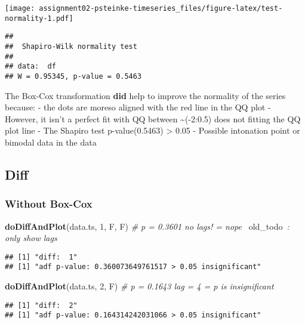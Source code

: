 \documentclass[]{article}
\newenvironment{Shaded}{\begin{snugshade}}{\end{snugshade}}
\newcommand{\AlertTok}[1]{\textcolor[rgb]{0.94,0.16,0.16}{#1}}
\newcommand{\CommentTok}[1]{\textcolor[rgb]{0.56,0.35,0.01}{\textit{#1}}}
\newcommand{\DecValTok}[1]{\textcolor[rgb]{0.00,0.00,0.81}{#1}}
\newcommand{\KeywordTok}[1]{\textcolor[rgb]{0.13,0.29,0.53}{\textbf{#1}}}
\newcommand{\NormalTok}[1]{#1}
\begin{document}
\texttt{[image: assignment02-psteinke-timeseries\_files/figure-latex/test-normality-1.pdf]}

\begin{verbatim}
## 
##  Shapiro-Wilk normality test
## 
## data:  df
## W = 0.95345, p-value = 0.5463
\end{verbatim}

The Box-Cox transformation \textbf{did} help to improve the normality of
the series because: - the dots are moreso aligned with the red line in
the QQ plot - However, it isn't a perfect fit with QQ between
\textasciitilde(-2:0.5) does not fitting the QQ plot line - The Shapiro
test p-value(0.5463) \textgreater{} 0.05 - Possible intonation point or
bimodal data in the data

\hypertarget{diff}{%
\subsection{Diff}\label{diff}}

\hypertarget{without-box-cox}{%
\subsubsection{Without Box-Cox}\label{without-box-cox}}

\begin{Shaded}
\begin{Highlighting}[]
\KeywordTok{doDiffAndPlot}\NormalTok{(data.ts, }\DecValTok{1}\NormalTok{, F, F) }\CommentTok{# p = 0.3601 no lags! = nope }\AlertTok{~old_todo~}\CommentTok{: only show lags}
\end{Highlighting}
\end{Shaded}

\begin{verbatim}
## [1] "diff:  1"
## [1] "adf p-value: 0.360073649761517 > 0.05 insignificant"
\end{verbatim}

\begin{Shaded}
\begin{Highlighting}[]
\KeywordTok{doDiffAndPlot}\NormalTok{(data.ts, }\DecValTok{2}\NormalTok{, F) }\CommentTok{# p = 0.1643 lag = 4 = p is insignificant}
\end{Highlighting}
\end{Shaded}

\begin{verbatim}
## [1] "diff:  2"
## [1] "adf p-value: 0.164314242031066 > 0.05 insignificant"
\end{verbatim}
\end{document}
